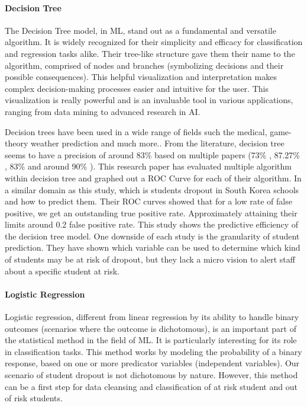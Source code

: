 \vspace{8pt}
\paragraph{Decision Tree}
The Decision Tree model, in ML, stand out as a fundamental and versatile algorithm. It is widely recognized for their simplicity and efficacy for classification and regression tasks alike.
Their tree-like structure gave them their name to the algorithm, comprised of nodes and branches (symbolizing decisions and their possible consequences). This helpful visualization and interpretation makes complex decision-making processes easier and intuitive for the user. This visualization is really powerful and is an invaluable tool in various applications, ranging from data mining to advanced research in AI.

Decision trees have been used in a wide range of fields such the medical, game-theory weather prediction and much more.\cite{quinlan_induction_1986}.
From the literature, decision tree seems to have a precision of around 83\% based on multiple papers (73\% \cite{viloria_integration_2019}, 87.27\% \cite{ramirez_prediction_2018}, 83\%\cite{kemper_predicting_2020} and around 90\% \cite{tenpipat_student_2020}). This research paper has evaluated multiple algorithm within decision tree and graphed out a ROC Curve for each of their algorithm. In a similar domain as this study, which is students dropout in South Korea schools and how to predict them. Their ROC curves showed that for a low rate of false positive, we get an outstanding true positive rate. Approximately attaining their limits around 0.2 false positive rate\cite{lee_machine_2019}. This study shows the predictive efficiency of the decision tree model. 
One downside of each study is the granularity of student prediction. They have shown which variable can be used to determine which kind of students may be at risk of dropout, but they lack a micro vision to alert staff about a specific student at risk.

\vspace{8pt}
\paragraph{Logistic Regression}
Logistic regression, different from linear regression by its ability to handle binary outcomes (scenarios where the outcome is dichotomous), is an important part of the statistical method in the field of ML. It is particularly interesting for its role in classification tasks. This method works by modeling the probability of a binary response, based on one or more predicator variables (independent variables). 
Our scenario of student dropout is not dichotomous by nature. However, this method can be a first step for data cleansing and classification of at risk student and out of risk students.

